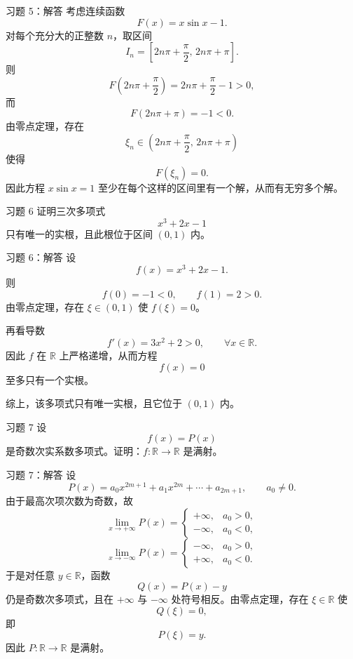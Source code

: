 ﻿\documentclass[aspectratio=169,11pt]{ctexbeamer}
\newcommand{\R}{\mathbb{R}}
\begin{document}
\begin{frame}[allowframebreaks]{习题 5：解答}
考虑连续函数
\[
  F(x)=x\sin x-1.
\]
对每个充分大的正整数 $n$，取区间
\[
  I_n=\left[2n\pi+\frac{\pi}{2},\,2n\pi+\pi\right].
\]
则
\[
  F\left(2n\pi+\frac{\pi}{2}\right)=2n\pi+\frac{\pi}{2}-1>0,
\]
而
\[
  F(2n\pi+\pi)=-1<0.
\]
由零点定理，存在
\[
  \xi_n\in\left(2n\pi+\frac{\pi}{2},\,2n\pi+\pi\right)
\]
使得
\[
  F(\xi_n)=0.
\]
因此方程 $x\sin x=1$ 至少在每个这样的区间里有一个解，从而有无穷多个解。
\end{frame}

\begin{frame}{习题 6}
证明三次多项式
\[
  x^3+2x-1
\]
只有唯一的实根，且此根位于区间 $(0,1)$ 内。
\end{frame}

\begin{frame}{习题 6：解答}
设
\[
  f(x)=x^3+2x-1.
\]
则
\[
  f(0)=-1<0,\qquad f(1)=2>0.
\]
由零点定理，存在 $\xi\in(0,1)$ 使 $f(\xi)=0$。
\vspace{0.5em}

再看导数
\[
  f'(x)=3x^2+2>0,\qquad \forall x\in\R.
\]
因此 $f$ 在 $\R$ 上严格递增，从而方程
\[
  f(x)=0
\]
至多只有一个实根。
\vspace{0.5em}

综上，该多项式只有唯一实根，且它位于 $(0,1)$ 内。
\end{frame}

\begin{frame}{习题 7}
设
\[
  f(x)=P(x)
\]
是奇数次实系数多项式。证明：$f:\R\to\R$ 是满射。
\end{frame}

\begin{frame}[allowframebreaks]{习题 7：解答}
设
\[
  P(x)=a_0x^{2m+1}+a_1x^{2m}+\cdots+a_{2m+1},\qquad a_0\ne 0.
\]
由于最高次项次数为奇数，故
\[
  \lim_{x\to+\infty}P(x)=
  \begin{cases}
    +\infty,& a_0>0,\\
    -\infty,& a_0<0,
  \end{cases}
\]
\[
  \lim_{x\to-\infty}P(x)=
  \begin{cases}
    -\infty,& a_0>0,\\
    +\infty,& a_0<0.
  \end{cases}
\]
于是对任意 $y\in\R$，函数
\[
  Q(x)=P(x)-y
\]
仍是奇数次多项式，且在 $+\infty$ 与 $-\infty$ 处符号相反。由零点定理，存在 $\xi\in\R$ 使
\[
  Q(\xi)=0,
\]
即
\[
  P(\xi)=y.
\]
因此 $P:\R\to\R$ 是满射。
\end{frame}
\end{document}
